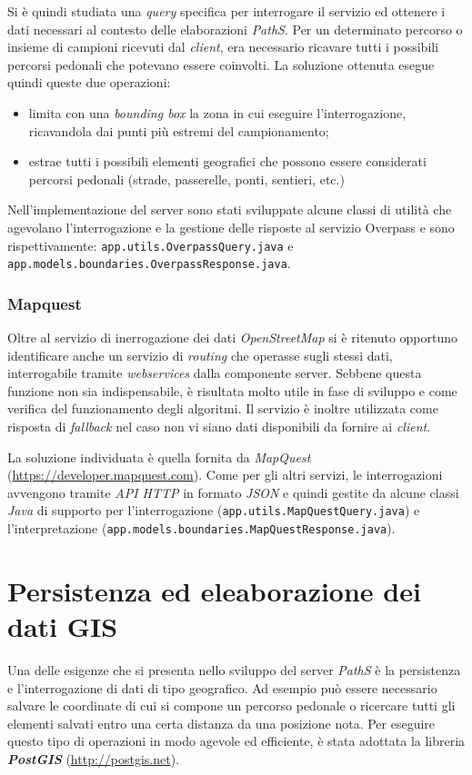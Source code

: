 Si è quindi studiata una \emph{query} specifica per interrogare il servizio ed ottenere i dati necessari al contesto delle elaborazioni \emph{PathS}. Per un determinato percorso o insieme di campioni ricevuti dal \emph{client}, era necessario ricavare tutti i possibili percorsi pedonali che potevano essere coinvolti. La soluzione ottenuta esegue quindi queste due operazioni:
\begin{itemize}
\item limita con una \emph{bounding box} la zona in cui eseguire l'interrogazione, ricavandola dai punti più estremi del campionamento;
\item estrae tutti i possibili elementi geografici che possono essere considerati percorsi pedonali (strade, passerelle, ponti, sentieri, etc.)
\end{itemize}
Nell'implementazione del server sono stati sviluppate alcune classi di utilità che agevolano l'interrogazione e la gestione delle risposte al servizio Overpass e sono rispettivamente: \texttt{app.\-utils.\-OverpassQuery.java} e \texttt{app.\-models.\-boundaries.\-OverpassResponse.java}.

\subsubsection{Mapquest}
Oltre al servizio di inerrogazione dei dati \emph{OpenStreetMap} si è ritenuto opportuno identificare anche un servizio di \emph{routing} che operasse sugli stessi dati, interrogabile tramite \emph{webservices} dalla componente server. Sebbene questa funzione non sia indispensabile, è risultata molto utile in fase di sviluppo e come verifica del funzionamento degli algoritmi. Il servizio è inoltre utilizzata come risposta di \emph{fallback} nel caso non vi siano dati disponibili da fornire ai \emph{client}.

La soluzione individuata è quella fornita da \emph{MapQuest} (\url{https://developer.mapquest.com}). Come per gli altri servizi, le interrogazioni avvengono tramite \emph{API HTTP} in formato \emph{JSON} e quindi gestite da alcune classi \emph{Java} di supporto per l'interrogazione (\texttt{app.\-utils.\-MapQuestQuery.java}) e l'interpretazione (\texttt{app.\-models.\-boundaries.\-MapQuestResponse.java}).


\section{Persistenza ed eleaborazione dei dati GIS}
Una delle esigenze che si presenta nello sviluppo del server \emph{PathS} è la persistenza e l'interrogazione di dati di tipo geografico. Ad esempio può essere necessario salvare le coordinate di cui si compone un percorso pedonale o ricercare tutti gli elementi salvati entro una certa distanza da una posizione nota. Per eseguire questo tipo di operazioni in modo agevole ed efficiente, è stata adottata la libreria \textbf{\emph{PostGIS}} (\url{http://postgis.net}).

